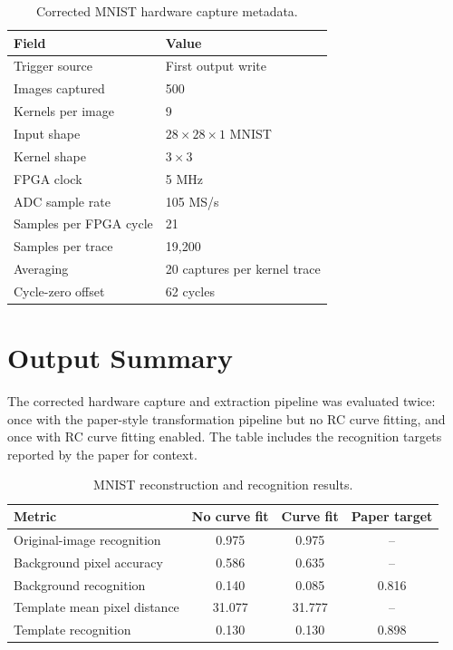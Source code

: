 \documentclass[11pt]{article}
\begin{document}
\begin{table}[H]
\centering
\caption{Corrected MNIST hardware capture metadata.}
\begin{tabular}{ll}
\toprule
Field & Value \\
\midrule
Trigger source & First output write \\
Images captured & 500 \\
Kernels per image & 9 \\
Input shape & $28 \times 28 \times 1$ MNIST \\
Kernel shape & $3 \times 3$ \\
FPGA clock & 5 MHz \\
ADC sample rate & 105 MS/s \\
Samples per FPGA cycle & 21 \\
Samples per trace & 19,200 \\
Averaging & 20 captures per kernel trace \\
Cycle-zero offset & 62 cycles \\
\bottomrule
\end{tabular}
\end{table}

\section{Output Summary}
The corrected hardware capture and extraction pipeline was evaluated twice:
once with the paper-style transformation pipeline but no RC curve fitting, and
once with RC curve fitting enabled.  The table includes the recognition targets
reported by the paper for context.

\begin{table}[H]
\centering
\caption{MNIST reconstruction and recognition results.}
\begin{tabular}{lccc}
\toprule
Metric & No curve fit & Curve fit & Paper target \\
\midrule
Original-image recognition & 0.975 & 0.975 & -- \\
Background pixel accuracy & 0.586 & 0.635 & -- \\
Background recognition & 0.140 & 0.085 & 0.816 \\
Template mean pixel distance & 31.077 & 31.777 & -- \\
Template recognition & 0.130 & 0.130 & 0.898 \\
\bottomrule
\end{tabular}
\end{table}
\end{document}
